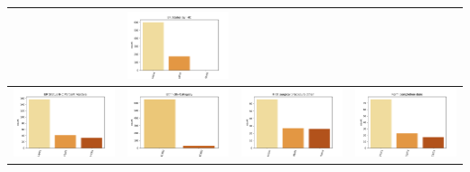 \begin{table}
\begin{center}
\begin{tabular}{ |c|c|c|c| }
			& \includegraphics[width=.25\textwidth]{NOTEBOOK/IMAGENES_CRUDAS/24} 
			\\  \hline 
			\includegraphics[width=.25\textwidth]{NOTEBOOK/IMAGENES_CRUDAS/25} 
			& \includegraphics[width=.25\textwidth]{NOTEBOOK/IMAGENES_CRUDAS/26} 
			& \includegraphics[width=.25\textwidth]{NOTEBOOK/IMAGENES_CRUDAS/27} 
			& \includegraphics[width=.25\textwidth]{NOTEBOOK/IMAGENES_CRUDAS/28}   
			\\  \hline                
		\end{tabular} 
	\end{center} 
\end{table}

